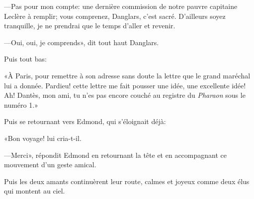 —Pas pour mon compte: une dernière commission de notre pauvre capitaine Leclère à remplir; vous comprenez, Danglars, c'est sacré. D'ailleurs soyez tranquille, je ne prendrai que le temps d'aller et revenir.

—Oui, oui, je comprends», dit tout haut Danglars.

Puis tout bas:

«À Paris, pour remettre à son adresse sans doute la lettre que le grand maréchal lui a donnée. Pardieu! cette lettre me fait pousser une idée, une excellente idée! Ah! Dantès, mon ami, tu n'es pas encore couché au registre du \textit{Pharaon} sous le numéro 1.»

Puis se retournant vers Edmond, qui s'éloignait déjà:

«Bon voyage! lui cria-t-il.

—Merci», répondit Edmond en retournant la tête et en accompagnant ce mouvement d'un geste amical.

Puis les deux amants continuèrent leur route, calmes et joyeux comme deux élus qui montent au ciel.



